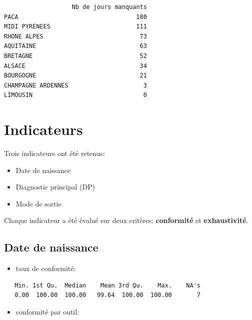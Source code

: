 \documentclass[]{article}
\begin{document}
\begin{verbatim}
                   Nb de jours manquants
PACA                                 180
MIDI PYRENEES                        111
RHONE ALPES                           73
AQUITAINE                             63
BRETAGNE                              52
ALSACE                                34
BOURGOGNE                             21
CHAMPAGNE ARDENNES                     3
LIMOUSIN                               0
\end{verbatim}

\section{Indicateurs}\label{indicateurs}

Trois indicateurs ont été retenus:

\begin{itemize}
\itemsep1pt\parskip0pt
\item
  Date de naissance
\item
  Diagnostic principal (DP)
\item
  Mode de sortie
\end{itemize}

Chaque indicateur a été évalué sur deux critères: \textbf{conformité} et
\textbf{exhaustivité}.

\subsection{Date de naissance}\label{date-de-naissance}

\begin{itemize}
\itemsep1pt\parskip0pt
\item
  taux de conformité:
\end{itemize}

\begin{verbatim}
   Min. 1st Qu.  Median    Mean 3rd Qu.    Max.    NA's 
   0.00  100.00  100.00   99.64  100.00  100.00       7 
\end{verbatim}

\begin{itemize}
\itemsep1pt\parskip0pt
\item
  conformité par outil:
\end{itemize}
\end{document}
